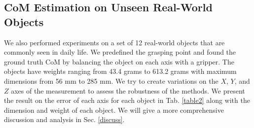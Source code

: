\subsection{CoM Estimation on Unseen Real-World Objects}
We also performed experiments on a set of 12 real-world objects that are commonly seen in daily life. We predefined the grasping point and found the ground truth CoM by balancing the object on each axis with a gripper.
The objects have weights ranging from 43.4 grams to 613.2 grams with maximum dimensions from 56 mm to 285 mm. We try to create variations on the $X$, $Y$, and $Z$ axes of the measurement to assess the robustness of the methods. We present the result on the error of each axis for each object in Tab. \ref{table2} along with the dimension and weight of each object. We will give a more comprehensive discussion and analysis in Sec. \ref{discuss}.
\renewcommand{\arraystretch}{1.1}

